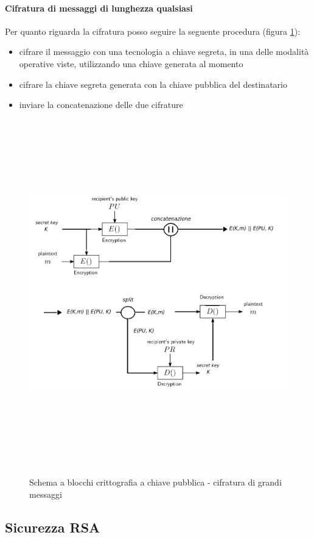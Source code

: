 \paragraph{Cifratura di messaggi di lunghezza qualsiasi}
Per quanto riguarda la cifratura posso seguire la seguente procedura (figura \ref{fig:pubblica_schema_grandi}):
\begin{itemize}
\item cifrare il messaggio con una tecnologia a chiave segreta, in una delle modalità operative viste, utilizzando una chiave generata al momento
\item cifrare la chiave segreta generata con la chiave pubblica del destinatario
\item inviare la concatenazione delle due cifrature
\end{itemize}
\begin{figure}[htbp]
	\centering%
	\subfigure%
	{\includegraphics[height=15cm, width=15cm, keepaspectratio]{Immagini/chiave_pubblica/chiave_pubblica_schema_grandi.png}}
	\caption{Schema a blocchi crittografia a chiave pubblica - cifratura di grandi messaggi \label{fig:pubblica_schema_grandi}} 	
\end{figure}
\subsection{Sicurezza RSA}

